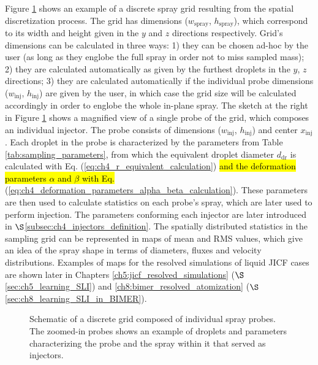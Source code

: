 Figure \ref{fig:SLI_discretization} shows an example of a discrete spray grid resulting from the spatial discretization process. The grid has dimensions ($w_\mathrm{spray}$, $h_\mathrm{spray}$), which correspond to its width and height given in the $y$ and $z$ directions respectively. Grid's dimensions can be calculated in three ways: 1) they can be chosen ad-hoc by the user (as long as they englobe the full spray in order not to miss sampled mass); 2) they are calculated automatically as given by the furthest droplets in the $y$, $z$ directions; 3) they are calculated automatically if the individual probe dimensions ($w_\mathrm{inj}$, $h_\mathrm{inj}$) are given by the user, in which case the grid size will be calculated accordingly in order to englobe the whole in-plane spray. The sketch at the right in Figure \ref{fig:SLI_discretization} shows a magnified view of a single probe of the grid, which composes an individual injector. The probe consists of dimensions ($w_\mathrm{inj}$, $h_\mathrm{inj}$) and center $x_\mathrm{inj}$. Each droplet in the probe is characterized by the parameters from Table \ref{tab:sampling_parameters}, from which the equivalent droplet diameter $d_\mathrm{dr}$ is calculated with Eq. (\ref{eq:ch4_r_equivalent_calculation}) \hl{and the deformation parameters $\alpha$ and $\beta$ with Eq.} (\ref{eq:ch4_deformation_parameters_alpha_beta_calculation}). These parameters are then used to calculate statistics on each probe's spray, which are later used to perform injection. The parameters conforming each injector are later introduced in $\S$\ref{subsec:ch4_injectors_definition}. The spatially distributed statistics in the sampling grid can be represented in maps of mean and RMS values, which give an idea of the spray shape in terms of diameters, fluxes and velocity distributions. Examples of maps for the resolved simulations of liquid JICF cases are shown later in Chapters \ref{ch5:jicf_resolved_simulations} ($\S$\ref{sec:ch5_learning_SLI}) and \ref{ch8:bimer_resolved_atomization} ($\S$\ref{sec:ch8_learning_SLI_in_BIMER}).

\clearpage

\begin{figure}[h!]	
	\centering
	\caption{Schematic of a discrete grid composed of individual spray probes. The zoomed-in probes shows an example of droplets and parameters characterizing the probe and the spray within it that served as injectors.}
	\label{fig:SLI_discretization}
\end{figure}


